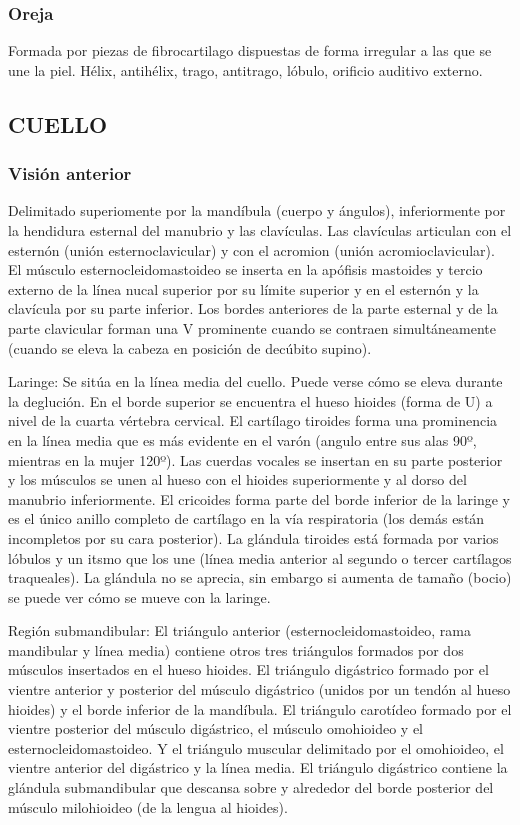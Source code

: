 \documentclass[a4paper,12pt]{article} %
\begin{document}
\begin{appendices}
\subsubsection{Oreja}
Formada por piezas de fibrocartilago dispuestas de forma irregular a las que se une la piel. Hélix, antihélix, trago, antitrago, lóbulo, orificio auditivo externo.


\subsection{CUELLO}

\subsubsection{Visión anterior}
Delimitado superiomente por la mandíbula (cuerpo y ángulos), inferiormente por la hendidura esternal del manubrio y las clavículas. Las clavículas articulan con el esternón (unión esternoclavicular) y con el acromion (unión acromioclavicular).
El músculo esternocleidomastoideo se inserta en la apófisis mastoides y tercio externo de la línea nucal superior por su límite superior y en el esternón y la clavícula por su parte inferior. Los bordes anteriores de la parte esternal y de la parte clavicular forman una V prominente cuando se contraen simultáneamente (cuando se eleva la cabeza en posición de decúbito supino).

Laringe: Se sitúa en la línea media del cuello. Puede verse cómo se eleva durante la deglución. En el borde superior se encuentra el hueso hioides (forma de U) a nivel de la cuarta vértebra cervical. El cartílago tiroides forma una prominencia en la línea media que es más evidente en el varón (angulo entre sus alas 90º, mientras en la mujer 120º). Las cuerdas vocales se insertan en su parte posterior y los músculos se unen al hueso con el hioides superiormente y al dorso del manubrio inferiormente. El cricoides forma parte del borde inferior de la laringe y es el único anillo completo de cartílago en la vía respiratoria (los demás están incompletos por su cara posterior). La glándula tiroides está formada por varios lóbulos y un itsmo que los une (línea media anterior al segundo o tercer cartílagos traqueales). La glándula no se aprecia, sin embargo si aumenta de tamaño (bocio) se puede ver cómo se mueve con la laringe. 

Región submandibular: El triángulo anterior (esternocleidomastoideo, rama mandibular y línea media) contiene otros tres triángulos formados por dos músculos insertados en el hueso hioides. El triángulo digástrico formado por el vientre anterior y posterior del músculo digástrico (unidos por un tendón al hueso hioides) y el borde inferior de la mandíbula. El triángulo carotídeo formado por el vientre posterior del músculo digástrico, el músculo omohioideo y el esternocleidomastoideo. Y el triángulo muscular delimitado por el omohioideo, el vientre anterior del digástrico y la línea media. El triángulo digástrico contiene la glándula submandibular que descansa sobre y alrededor del borde posterior del músculo milohioideo (de la lengua al hioides). 


\end{appendices}
\end{document}
